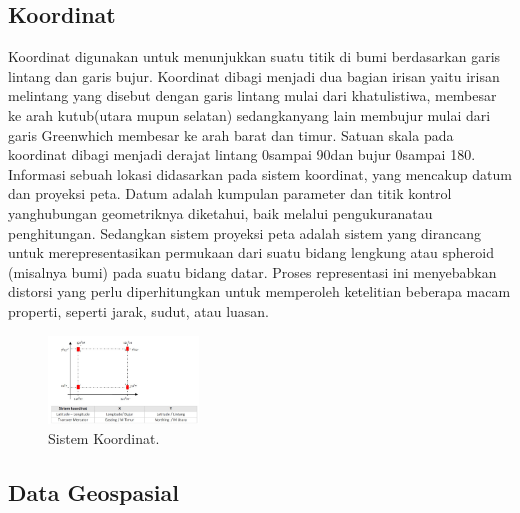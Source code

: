 \subsection{Koordinat}
Koordinat digunakan untuk menunjukkan suatu titik di bumi berdasarkan garis lintang dan garis bujur. Koordinat dibagi menjadi dua bagian irisan yaitu irisan melintang yang disebut dengan garis lintang mulai dari khatulistiwa, membesar ke arah kutub(utara mupun selatan) sedangkanyang lain membujur mulai dari garis Greenwhich membesar ke arah barat dan timur. Satuan skala pada koordinat dibagi menjadi derajat lintang 0\textdegree sampai 90\textdegree dan bujur 0\textdegree sampai 180\textdegree.
Informasi sebuah lokasi didasarkan pada sistem koordinat, yang mencakup datum dan proyeksi peta. Datum adalah kumpulan parameter dan titik kontrol yanghubungan geometriknya diketahui, baik melalui pengukuranatau penghitungan. Sedangkan sistem proyeksi peta adalah sistem yang dirancang untuk merepresentasikan permukaan dari suatu bidang lengkung atau spheroid (misalnya bumi) pada suatu bidang datar. Proses representasi ini menyebabkan distorsi yang perlu diperhitungkan untuk memperoleh ketelitian beberapa macam properti, seperti jarak, sudut, atau luasan.
\begin{figure}[H]
	\includegraphics[width=4cm]{figures/1174006/1174006koordinat1.jpg}
	\centering
	\caption{Sistem Koordinat.}
\end{figure}
\subsection{Data Geospasial}
